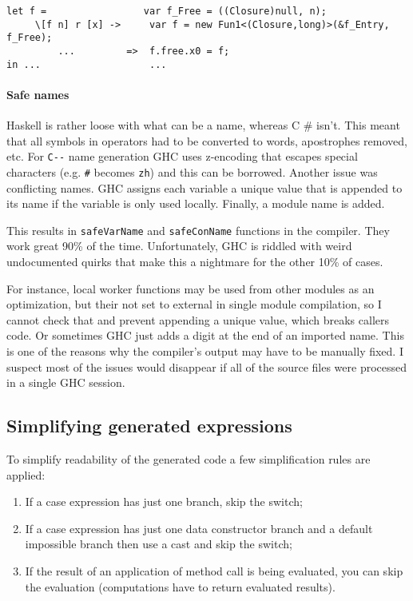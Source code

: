 \documentclass[en]{pracamgr}
\newcommand{\shrp}{%
  {\fontfamily{ppl}\selectfont\#%
  }}
\begin{document}
\begin{center}
\verb|let f =                 var f_Free = ((Closure)null, n);                   |\\
\verb|     \[f n] r [x] ->     var f = new Fun1<(Closure,long)>(&f_Entry, f_Free);|\\
\verb|         ...         =>  f.free.x0 = f;                                     |\\
\verb|in ...                   ...                                                |\\
\end{center}

\paragraph{Safe names}\label{c:safe_names}
Haskell is rather loose with what can be a name, whereas C\shrp{} isn't.
This meant that all symbols in operators had to be converted to words,
apostrophes removed, etc. For \verb|C--| name generation GHC uses
z-encoding that escapes special characters (e.g. \texttt{\#} becomes \texttt{zh})
and this can be borrowed.
Another issue was conflicting names.
GHC assigns each variable a unique value that is appended to its name
if the variable is only used locally. Finally, a module name is added.

This results in \texttt{safeVarName} and \texttt{safeConName} functions in the compiler.
They work great 90\% of the time. Unfortunately, GHC is riddled with weird undocumented
quirks that make this a nightmare for the other 10\% of cases.

For instance, local worker functions may be used from other modules as an optimization,
but their not set to external in single module compilation, so I cannot check that
and prevent appending a unique value,
which breaks callers code. Or sometimes GHC just adds a digit at the end of an imported name.
This is one of the reasons why the compiler's output may have to be manually fixed.
I suspect most of the issues would disappear if all of the source files were processed
in a single GHC session.

\newpage
\subsection{Simplifying generated expressions}
To simplify readability of the generated code a few simplification rules are applied:

\begin{enumerate}
    \item If a case expression has just one branch, skip the switch;
    \item If a case expression has just one data constructor branch and a default impossible branch
            then use a cast and skip the switch;
    \item If the result of an application of method call is being evaluated, you can skip the evaluation
        (computations have to return evaluated results).
\end{enumerate}
\end{document}
